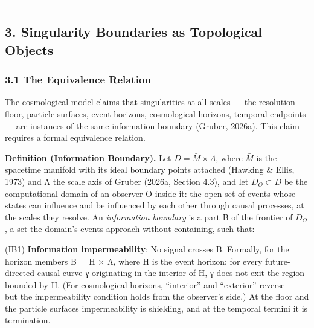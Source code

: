 \documentclass[
]{article}
\begin{document}
\begin{center}\rule{0.5\linewidth}{0.5pt}\end{center}

\hypertarget{singularity-boundaries-as-topological-objects}{%
\subsection{3. Singularity Boundaries as Topological
Objects}\label{singularity-boundaries-as-topological-objects}}

\hypertarget{the-equivalence-relation}{%
\subsubsection{3.1 The Equivalence
Relation}\label{the-equivalence-relation}}

The cosmological model claims that singularities at all scales --- the
resolution floor, particle surfaces, event horizons, cosmological
horizons, temporal endpoints --- are instances of the same information
boundary (Gruber, 2026a). This claim requires a formal equivalence
relation.

\textbf{Definition (Information Boundary).} Let
\(D = \bar{M} \times \Lambda\), where \(\bar{M}\) is the spacetime
manifold with its ideal boundary points attached (Hawking \& Ellis,
1973) and Λ the scale axis of Gruber (2026a, Section 4.3), and let
\(D_O \subset D\) be the computational domain of an observer O inside
it: the open set of events whose states can influence and be influenced
by each other through causal processes, at the scales they resolve. An
\emph{information boundary} is a part B of the frontier of \(D_O\), a
set the domain's events approach without containing, such that:

(IB1) \textbf{Information impermeability}: No signal crosses B.
Formally, for the horizon members B = H × Λ, where H is the event
horizon: for every future-directed causal curve γ originating in the
interior of H, γ does not exit the region bounded by H. (For
cosmological horizons, ``interior'' and ``exterior'' reverse --- but the
impermeability condition holds from the observer's side.) At the floor
and the particle surfaces impermeability is shielding, and at the
temporal termini it is termination.
\end{document}
